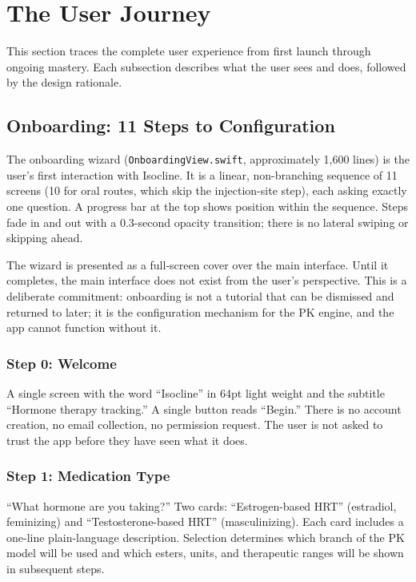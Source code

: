 \documentclass[11pt,a4paper]{article}
\newcommand{\code}[1]{\texttt{\small #1}}
\begin{document}
\section{The User Journey}
\label{sec:journey}

This section traces the complete user experience from first launch
through ongoing mastery. Each subsection describes what the user sees and
does, followed by the design rationale.

\subsection{Onboarding: 11 Steps to Configuration}
\label{sec:onboarding}

The onboarding wizard (\code{OnboardingView.swift}, approximately 1,600
lines) is the user's first interaction with Isocline. It is a linear,
non-branching sequence of 11 screens (10 for oral routes, which skip the
injection-site step), each asking exactly one question. A progress bar at
the top shows position within the sequence. Steps fade in and out with a
0.3-second opacity transition; there is no lateral swiping or skipping
ahead.

The wizard is presented as a full-screen cover over the main interface.
Until it completes, the main interface does not exist from the user's
perspective. This is a deliberate commitment: onboarding is not a tutorial
that can be dismissed and returned to later; it is the configuration
mechanism for the PK engine, and the app cannot function without it.

\subsubsection{Step 0: Welcome}

A single screen with the word ``Isocline'' in 64pt light weight and the
subtitle ``Hormone therapy tracking.'' A single button reads ``Begin.''
There is no account creation, no email collection, no permission request.
The user is not asked to trust the app before they have seen what it
does.

\subsubsection{Step 1: Medication Type}

``What hormone are you taking?'' Two cards: ``Estrogen-based HRT''
(estradiol, feminizing) and ``Testosterone-based HRT'' (masculinizing).
Each card includes a one-line plain-language description. Selection
determines which branch of the PK model will be used and which esters,
units, and therapeutic ranges will be shown in subsequent steps.
\end{document}

